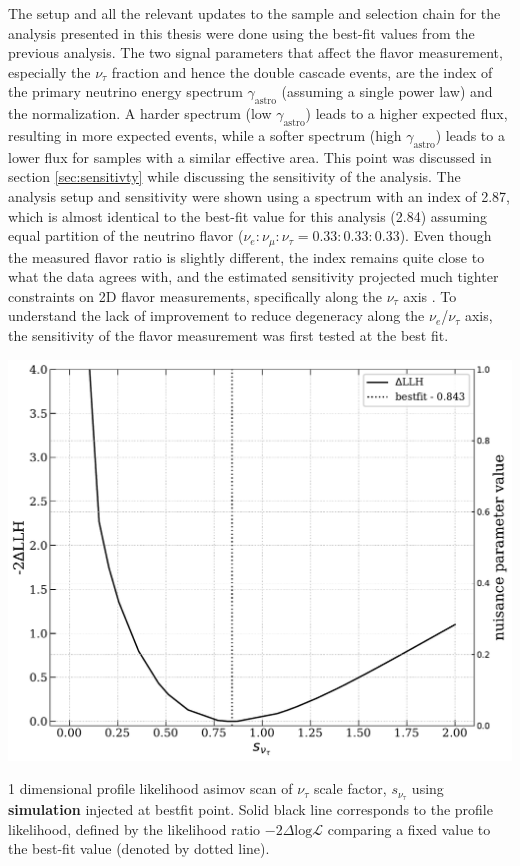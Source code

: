 The setup and all the relevant updates to the sample and selection chain for the analysis presented in this thesis were done using the best-fit values from the previous analysis. The two signal parameters that affect the flavor measurement, especially the $\nu_{\tau}$ fraction and hence the double cascade events, are the index of the primary neutrino energy spectrum $\gamma_{\mathrm{astro}}$ (assuming a single power law) and the normalization. A harder spectrum (low $\gamma_{\mathrm{astro}}$) leads to a higher expected flux, resulting in more expected events, while a softer spectrum (high $\gamma_{\mathrm{astro}}$) leads to a lower flux for samples with a similar effective area. This point was discussed in section \ref{sec:sensitivty} while discussing the sensitivity of the analysis. The analysis setup and sensitivity were shown using a spectrum with an index of 2.87, which is almost identical to the best-fit value for this analysis (2.84) assuming equal partition of the neutrino flavor ($\nu_e : \nu_{\mu} : \nu_{\tau} = 0.33 : 0.33 : 0.33$). Even though the measured flavor ratio is slightly different, the index remains quite close to what the data agrees with, and the estimated sensitivity projected much tighter constraints on 2D flavor measurements, specifically along the $\nu_{\tau}$ axis . To understand the lack of improvement to reduce degeneracy along the $\nu_{e}$/$\nu_{\tau}$ axis, the sensitivity of the flavor measurement was first tested at the best fit.

\begin{marginfigure}
    
    \includegraphics{./figures/results/simulation_profile_scan_astro_nutau_ratio.pdf}
    
    \caption{1 dimensional profile likelihood asimov scan of $\nu_{\tau}$ scale factor, $s_{\nu_{\tau}}$ using \textbf{simulation} injected at bestfit point. Solid black line corresponds to the profile likelihood, defined by the likelihood ratio $-2\Delta\mathrm{log}\mathcal{L}$ comparing a fixed value to the best-fit value (denoted by dotted line).}

\end{marginfigure}

